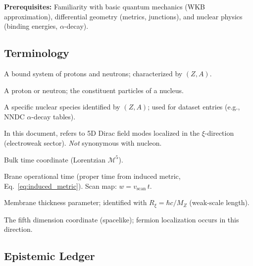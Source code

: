 \documentclass[11pt,a4paper]{article}
\begin{document}
\textbf{Prerequisites:} Familiarity with basic quantum mechanics (WKB approximation), differential geometry (metrics, junctions), and nuclear physics (binding energies, $\alpha$-decay).

\subsection*{Terminology}
\label{box:terminology}

\begin{tcolorbox}[colback=gray!5, colframe=gray!50, title=Key Terms]
\begin{description}[nosep,leftmargin=1em]
    \item[Nucleus (pl.\ nuclei):] A bound system of protons and neutrons; characterized by $(Z,A)$.
    \item[Nucleon:] A proton or neutron; the constituent particles of a nucleus.
    \item[Nuclide:] A specific nuclear species identified by $(Z,A)$; used for dataset entries (e.g., NNDC $\alpha$-decay tables).
    \item[Fermion:] In this document, refers to 5D Dirac field modes localized in the $\xi$-direction (electroweak sector). \emph{Not} synonymous with nucleon.
    \item[$w$:] Bulk time coordinate (Lorentzian $\mathcal{M}^5$).
    \item[$t$:] Brane operational time (proper time from induced metric, Eq.~\ref{eq:induced_metric}). Scan map: $w = v_{\mathrm{scan}}\,t$.
    \item[$\delta$:] Membrane thickness parameter; identified with $R_\xi = \hbar c / M_Z$ (weak-scale length).
    \item[$\xi$:] The fifth dimension coordinate (spacelike); fermion localization occurs in this direction.
\end{description}
\end{tcolorbox}

\subsection*{Epistemic Ledger}
\end{document}
